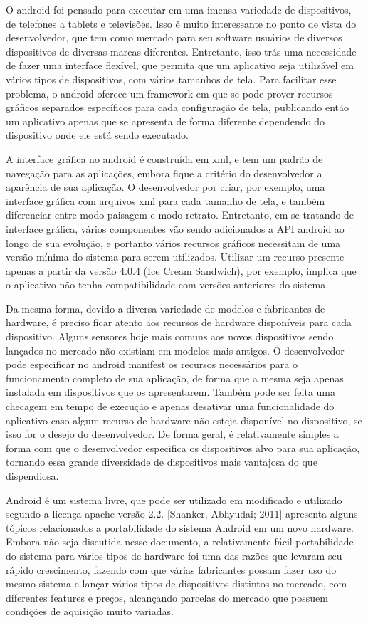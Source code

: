 O android foi pensado para executar em uma imensa variedade de dispositivos, de telefones a tablets e televisões. Isso é muito interessante no ponto de vista do desenvolvedor, que tem como mercado para seu software usuários de diversos dispositivos de diversas marcas diferentes. Entretanto, isso trás uma necessidade de fazer uma interface flexível, que permita que um aplicativo seja utilizável em vários tipos de dispositivos, com vários tamanhos de tela. Para facilitar esse problema, o android oferece um framework em que se pode prover recursos gráficos separados específicos para cada configuração de tela, publicando então um aplicativo apenas que se apresenta de forma diferente dependendo do dispositivo onde ele está sendo executado.  

A interface gráfica no android é construída em xml, e tem um padrão de navegação para as aplicações, embora fique a critério do desenvolvedor a aparência de sua aplicação. O desenvolvedor por criar, por exemplo, uma interface gráfica com arquivos xml para cada tamanho de tela, e também diferenciar entre modo paisagem e modo retrato. Entretanto, em se tratando de interface gráfica, vários componentes vão sendo adicionados a API android ao longo de sua evolução, e portanto vários recursos gráficos necessitam de uma versão mínima do sistema para serem utilizados. Utilizar um recurso presente apenas a partir da versão 4.0.4 (Ice Cream Sandwich), por exemplo, implica que o aplicativo não tenha compatibilidade com versões anteriores do sistema.  

Da mesma forma, devido a diversa variedade de modelos e fabricantes de hardware, é preciso ficar atento aos recursos de hardware disponíveis para cada dispositivo. Alguns sensores hoje mais comuns aos novos dispositivos sendo lançados no mercado não existiam em modelos mais antigos. O desenvolvedor pode especificar no android manifest os recursos necessários para o funcionamento completo de sua aplicação, de forma que a mesma seja apenas instalada em dispositivos que os apresentarem. Também pode ser feita uma checagem em tempo de execução e apenas desativar uma funcionalidade do aplicativo caso algum recurso de hardware não esteja disponível no dispositivo, se isso for o desejo do desenvolvedor. De forma geral, é relativamente simples a forma com que o desenvolvedor especifica os dispositivos alvo para sua aplicação, tornando essa grande diversidade de dispositivos mais vantajosa do que dispendiosa. 

Android é um sistema livre, que pode ser utilizado em modificado e utilizado segundo a licença apache versão 2.2. [Shanker, Abhyudai; 2011] apresenta alguns tópicos relacionados a portabilidade do sistema Android em um novo hardware. Embora não seja discutida nesse documento, a relativamente fácil portabilidade do sistema para vários tipos de hardware foi uma das razões que levaram seu rápido crescimento, fazendo com que várias fabricantes possam fazer uso do mesmo sistema e lançar vários tipos de dispositivos distintos no mercado, com diferentes features e preços, alcançando parcelas do mercado que possuem condições de aquisição muito variadas.





